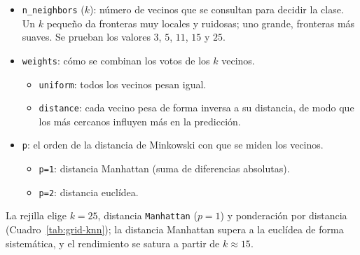 \documentclass[12pt,a4paper]{report}
\theoremstyle{definition}
\newcommand{\tc}[1]{\texttt{#1}}
\begin{document}
\begin{itemize}
\item \tc{n\_neighbors} ($k$): número de vecinos que se consultan para decidir la clase. Un
$k$ pequeño da fronteras muy locales y ruidosas; uno grande, fronteras más suaves. Se prueban
los valores $3$, $5$, $11$, $15$ y $25$.
\item \tc{weights}: cómo se combinan los votos de los $k$ vecinos.
  \begin{itemize}
  \item \tc{uniform}: todos los vecinos pesan igual.
  \item \tc{distance}: cada vecino pesa de forma inversa a su distancia, de modo que los más
  cercanos influyen más en la predicción.
  \end{itemize}
\item \tc{p}: el orden de la distancia de Minkowski con que se miden los vecinos.
  \begin{itemize}
  \item \tc{p=1}: distancia Manhattan (suma de diferencias absolutas).
  \item \tc{p=2}: distancia euclídea.
  \end{itemize}
\end{itemize}

La rejilla elige $k=25$, distancia \tc{Manhattan} ($p=1$) y ponderación por distancia (Cuadro~\ref{tab:grid-knn}); la distancia Manhattan supera a la euclídea de forma sistemática, y el rendimiento se satura a partir de $k\approx15$.
\end{document}
